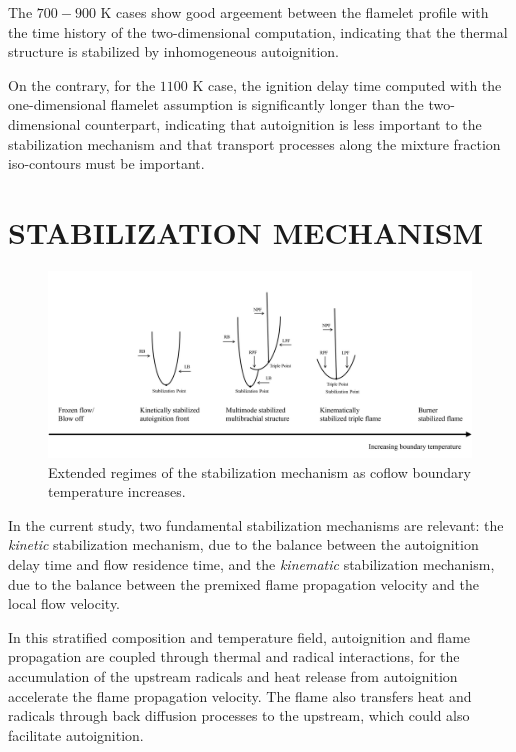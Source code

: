 \documentclass[twocolumn,10pt]{hphrc}
\begin{document}
The $700-900$ K cases show good argeement between the flamelet profile with the time history of the two-dimensional computation, indicating that the thermal structure is stabilized by inhomogeneous autoignition.  

On the contrary, for the $1100$ K case, the ignition delay time computed with the one-dimensional flamelet assumption is significantly longer than the two-dimensional counterpart, indicating that autoignition is less important to the stabilization mechanism and that transport processes along the mixture fraction iso-contours must be important.

\section*{STABILIZATION MECHANISM}
\begin{figure}
  \centering
  \includegraphics[width=5in]{regime}
  \caption{Extended regimes of the stabilization mechanism as coflow boundary temperature increases.}
  \label{fig:regime}
\end{figure}

In the current study, two fundamental stabilization mechanisms are relevant: the \emph {kinetic} stabilization mechanism, due to the balance between the autoignition delay time and flow residence time, and the \emph {kinematic} stabilization mechanism, due to the balance between the premixed flame propagation velocity and the local flow velocity. 

In this stratified composition and temperature field, autoignition and flame propagation are coupled through thermal and radical interactions, for the accumulation of the upstream radicals and heat release from autoignition accelerate the flame propagation velocity.  The flame also transfers heat and radicals through back diffusion processes to the upstream, which could also facilitate autoignition.
\end{document}
